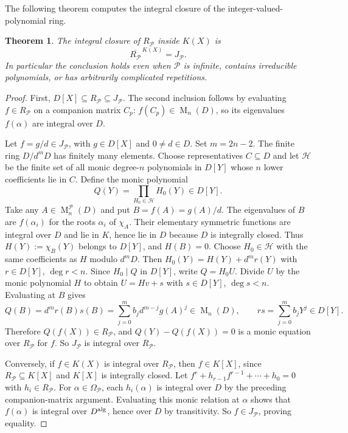\documentclass[11pt]{amsart}
\newtheorem{theorem}{Theorem}[section]
\theoremstyle{definition}
\theoremstyle{remark}
\newcommand{\Mat}{\operatorname{M}}
\begin{document}
The following theorem computes the integral closure of the integer-valued-polynomial ring.
\begin{theorem}
\label{thm:integrality}
The integral closure of $R_{\mathcal P}$ inside $K(X)$ is
\begin{equation}\label{eq:integral}
\overline{R_{\mathcal P}}^{\,K(X)}=J_{\mathcal P}.
\end{equation}
In particular the conclusion holds even when $\mathcal P$ is infinite,
contains irreducible polynomials, or has arbitrarily complicated repetitions.
\end{theorem}
\begin{proof}
First, $D[X]\subseteq R_{\mathcal P}\subseteq J_{\mathcal P}$.
The second inclusion follows by evaluating $f\in R_{\mathcal P}$
on a companion matrix $C_p$: $f(C_p)\in\Mat_n(D)$, so its eigenvalues
$f(\alpha)$ are integral over $D$.

Let $f=g/d\in J_{\mathcal P}$, with $g\in D[X]$ and $0\ne d\in D$.
Set $m=2n-2$. The finite ring $D/d^mD$ has finitely many elements.
Choose representatives $C\subseteq D$ and let $\mathcal H$ be the
finite set of all monic degree-$n$ polynomials in $D[Y]$ whose
$n$ lower coefficients lie in $C$. Define the monic polynomial
\[
Q(Y)=\prod_{H_0\in\mathcal H}H_0(Y)\in D[Y].
\]
Take any $A\in\Mat_n^{\mathcal P}(D)$ and put $B=f(A)=g(A)/d$.
The eigenvalues of $B$ are $f(\alpha_i)$ for the roots $\alpha_i$
of $\chi_A$. Their elementary symmetric functions are integral over
$D$ and lie in $K$, hence lie in $D$ because $D$ is integrally closed.
Thus $H(Y):=\chi_B(Y)$ belongs to $D[Y]$, and $H(B)=0$.
Choose $H_0\in\mathcal H$ with the same coefficients as $H$ modulo
$d^mD$. Then
$H_0(Y)=H(Y)+d^m r(Y)$ with $r\in D[Y]$, $\deg r<n$.
Since $H_0\mid Q$ in $D[Y]$, write $Q=H_0U$. Divide $U$ by the monic
polynomial $H$ to obtain $U=Hv+s$ with $s\in D[Y]$, $\deg s<n$.
Evaluating at $B$ gives
\[
Q(B)=d^m r(B)s(B)=
 \sum_{j=0}^m b_jd^{m-j}g(A)^j\in\Mat_n(D),
\qquad rs=\sum_{j=0}^m b_jY^j\in D[Y].
\]
Therefore $Q(f(X))\in R_{\mathcal P}$, and
$Q(Y)-Q(f(X))=0$ is a monic equation over $R_{\mathcal P}$ for $f$.
So $J_{\mathcal P}$ is integral over $R_{\mathcal P}$.

Conversely, if $f\in K(X)$ is integral over $R_{\mathcal P}$,
then $f\in K[X]$, since $R_{\mathcal P}\subseteq K[X]$
and $K[X]$ is integrally closed. Let
$f^r+h_{r-1}f^{r-1}+\cdots+h_0=0$ with $h_i\in R_{\mathcal P}$.
For $\alpha\in\Omega_{\mathcal P}$, each $h_i(\alpha)$
is integral over $D$ by the preceding companion-matrix argument.
Evaluating this monic relation at $\alpha$ shows that $f(\alpha)$
is integral over $D^{\rm alg}$, hence over $D$ by transitivity.
So $f\in J_{\mathcal P}$, proving equality.
\end{proof}
\end{document}
